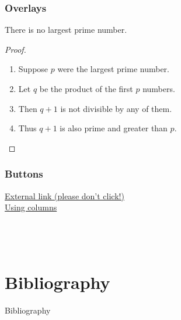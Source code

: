 \documentclass[aspectratio=169]{beamer}
\begin{document}
\begin{frame}
    \frametitle{Overlays}
    \begin{theorem}
        There is no largest prime number.
    \end{theorem}
    \begin{proof}
        \begin{enumerate}
            \item<1-| alert@1> Suppose $p$ were the largest prime number.
            \item<2-> Let $q$ be the product of the first $p$ numbers.\footnotemark[1]
            \item<3-> Then $q+1$ is not divisible by any of them.\footnotemark[1]
            \item<1-> Thus $q+1$ is also prime and greater than $p$.
        \end{enumerate}
    \end{proof}

\end{frame}

\begin{frame}
    \frametitle{Buttons}

    \href{https://youtu.be/dQw4w9WgXcQ}{External link (please don't click!)}\\
    \hyperlink{usingcols}{Using columns}\\
    \hyperlink{contents}{}\\
    \hyperlink{acronyms}{}\\
    \hyperlink{image}{}\\
    \hyperlink{table}{}
\end{frame}

\section{Bibliography}
\framesection

\begin{frame}{Bibliography}
    
    
\end{frame}
\end{document}
